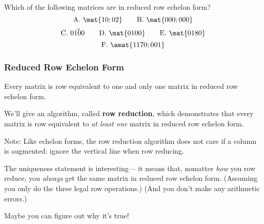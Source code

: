 
\begin{pollframe}

\begin{bluebox}[Poll]{.8\textwidth}
  Which of the following matrices are in reduced row echelon form?
  \[ \textrm{A.}~ \mat{1 0; 0 2} \qquad \textrm{B.}~ \mat{0 0 0;0 0 0} \]
  \[ \textrm{C.}~ \vec{0 1 0 0} \qquad \textrm{D.}~ \mat{0 1 0 0} \qquad
  \textrm{E.}~ \mat{0 1 8 0} \]
  \[ \textrm{F.}~ \amat{1 17 0;0 0 1} \]
\end{bluebox}


\end{pollframe}



\begin{frame}
\frametitle{Reduced Row Echelon Form}

\vskip-3mm
\begin{thm}
  Every matrix is row equivalent to one and only one matrix in reduced row
  echelon form.
\end{thm}

\pause
\bigskip
We'll give an algorithm, called \textbf{row reduction}, which demonstrates that
every matrix is row equivalent to \emph{at least one} matrix in reduced row
echelon form.

\pause
\bigskip
\alert{Note:} Like echelon forms, the row reduction algorithm does not care if a
column is augmented: ignore the vertical line when row reducing.

\pause\bigskip
The uniqueness statement is interesting---%
\pause
it means that, nomatter \emph{how\/} you row reduce, you \emph{always\/} get the
same matrix in reduced row echelon form.
\pause
(Assuming you only do the three legal row operations.)
\pause
(And you don't make any arithmetic errors.)

\pause\bigskip
Maybe you can figure out why it's true!

\end{frame}



